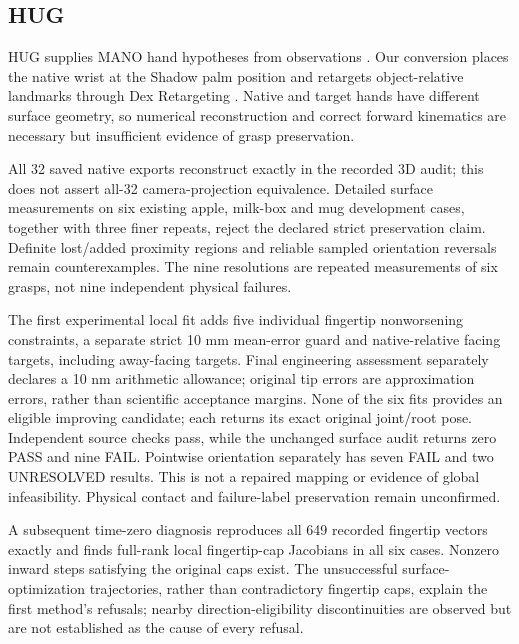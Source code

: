 \documentclass[10pt,letterpaper]{article}
\begin{document}
\subsection{HUG}
HUG supplies MANO hand hypotheses from observations \cite{hug}. Our conversion
places the native wrist at the Shadow palm position and retargets object-relative
landmarks through Dex Retargeting \cite{dex}. Native and target hands have
different surface geometry, so numerical reconstruction and correct forward
kinematics are necessary but insufficient evidence of grasp preservation.

All 32 saved native exports reconstruct exactly in the recorded 3D audit;
this does not assert all-32 camera-projection equivalence. Detailed surface
measurements on six existing apple, milk-box and mug development cases, together
with three finer repeats, reject the declared strict preservation claim.
Definite lost/added proximity regions and reliable sampled orientation reversals
remain counterexamples. The nine resolutions are repeated measurements of six
grasps, not nine independent physical failures.

The first experimental local fit adds five individual fingertip nonworsening
constraints, a separate strict 10 mm mean-error guard and native-relative facing
targets, including away-facing targets. Final engineering assessment separately
declares a 10 nm arithmetic allowance; original tip errors are approximation
errors, rather than scientific acceptance margins. None of the six fits provides
an eligible improving candidate; each returns its exact original joint/root pose.
Independent source checks pass, while the unchanged surface audit returns zero
PASS and nine FAIL. Pointwise orientation separately has seven FAIL and two
UNRESOLVED results. This is not a repaired mapping or evidence of global
infeasibility. Physical contact and failure-label preservation remain unconfirmed.


A subsequent time-zero diagnosis reproduces all 649 recorded fingertip vectors
exactly and finds full-rank local fingertip-cap Jacobians in all six cases.
Nonzero inward steps satisfying the original caps exist. The unsuccessful
surface-optimization trajectories, rather than contradictory fingertip caps,
explain the first method's refusals; nearby direction-eligibility discontinuities
are observed but are not established as the cause of every refusal.
\end{document}

